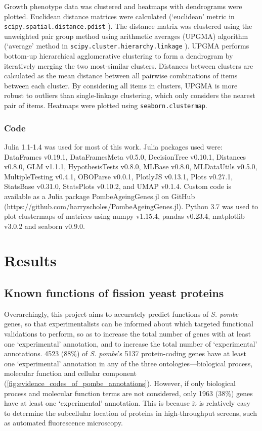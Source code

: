Growth phenotype data was clustered \cite{DHaeseleer2005} and heatmaps with dendrograms were plotted. Euclidean distance matrices were calculated \cite{Gibbons2002} (`euclidean' metric in \texttt{scipy.spatial.distance.pdist} \cite{Virtanen2020a}). The distance matrix was clustered using the unweighted pair group method using arithmetic averages (UPGMA) algorithm \cite{Sokal1958} (`average' method in \texttt{scipy.cluster.hierarchy.linkage} \cite{Virtanen2020a}). UPGMA performs bottom-up hierarchical agglomerative clustering to form a dendrogram by iteratively merging the two most-similar clusters. Distances between clusters are calculated as the mean distance between all pairwise combinations of items between each cluster. By considering all items in clusters, UPGMA is more robust to outliers than single-linkage clustering, which only considers the nearest pair of items. Heatmaps were plotted using \texttt{seaborn.clustermap}.

\subsubsection{Code}

Julia 1.1-1.4 was used for most of this work. Julia packages used were: DataFrames v0.19.1, DataFramesMeta v0.5.0, DecisionTree v0.10.1, Distances v0.8.0, GLM v1.1.1, HypothesisTests v0.8.0, MLBase v0.8.0, MLDataUtils v0.5.0, MultipleTesting v0.4.1, OBOParse v0.0.1, PlotlyJS v0.13.1, Plots v0.27.1, StatsBase v0.31.0, StatsPlots v0.10.2, and UMAP v0.1.4. Custom code is available as a Julia package PombeAgeingGenes.jl on GitHub (https://github.com/harryscholes/PombeAgeingGenes.jl). Python 3.7 was used to plot clustermaps of matrices using numpy v1.15.4, pandas v0.23.4, matplotlib v3.0.2 and seaborn v0.9.0.


\section{Results}

\subsection{Known functions of fission yeast proteins}
\label{sec:fission-yeast-known-functions}

Overarchingly, this project aims to accurately predict functions of \emph{S. pombe} genes, so that experimentalists can be informed about which targeted functional validations to perform, so as to increase the total number of genes with at least one `experimental' annotation, and to increase the total number of `experimental' annotations. \num{4523} ($88\%$) of \emph{S. pombe}'s \num{5137} protein-coding genes have at least one `experimental' annotation in any of the three ontologies---biological process, molecular function and cellular component (\ref{fig:evidence_codes_of_pombe_annotations}). However, if only biological process and molecular function terms are not considered, only \num{1963} ($38\%$) genes have at least one `experimental' annotation. This is because it is relatively easy to determine the subcellular location of proteins in high-throughput screens, such as automated fluorescence microscopy.

